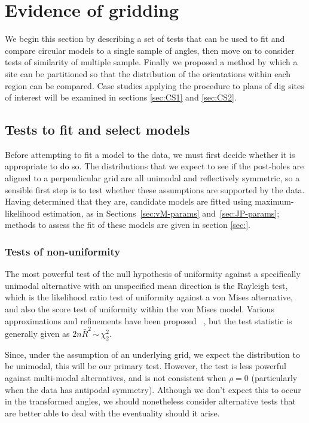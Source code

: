 \documentclass[../../ArchStats.tex]{subfiles}
\begin{document}
\section{Evidence of gridding}
\label{sec:gridding}
We begin this section by describing a set of tests that can be used to fit and compare circular models to a single sample of angles, then move on to consider tests of similarity of multiple sample. Finally we proposed a method by which a site can be partitioned so that the distribution of the orientations within each region can be compared. Case studies applying the procedure to plans of dig sites of interest will be examined in sections \ref{sec:CS1} and \ref{sec:CS2}.

\subsection{Tests to fit and select models}
\label{sec:model-fitting-tests}

Before attempting to fit a model to the data, we must first decide whether it is appropriate to do so. The distributions that we expect to see if the post-holes are aligned to a perpendicular grid are all unimodal and reflectively symmetric, so a sensible first step is to test whether these assumptions are supported by the data. Having determined that they are, candidate models are fitted using maximum-likelihood estimation, as in Sections~\ref{sec:vM-params} and~\ref{sec:JP-params}; methods to assess the fit of these models are given in section \ref{sec:}.


\subsubsection{Tests of non-uniformity}
\label{sec:unif-tests}

The most powerful test of the null hypothesis of uniformity against a specifically unimodal alternative with an unspecified mean direction is the Rayleigh test, which is the likelihood ratio test of uniformity against a von Mises alternative, and also the score test of uniformity within the von Mises model. Various approximations and refinements have been proposed ~\cite{Mardia1999}, but the test statistic is generally given as $2n\bar{R}^2 \, \dot{\sim} \, \chi^2_2$.

Since, under the assumption of an underlying grid, we expect the distribution to be unimodal, this will be our primary test. However, the test is less powerful against multi-modal alternatives, and is not consistent when $\rho = 0$ (particularly when the data has antipodal symmetry). Although we don't expect this to occur in the transformed angles, we should nonetheless consider alternative tests that are better able to deal with the eventuality should it arise.
\end{document}
